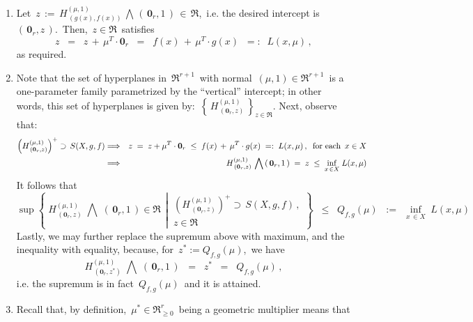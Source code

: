\begin{enumerate}
\item
	Let \,$z \,:=\, H^{(\mu,1)}_{\,(g(x),f(x))} \,\bigwedge\, (\,\mathbf{0}_{r},1\,) \,\in\, \Re$,\,
	i.e. the desired intercept is \,$(\,\mathbf{0}_{r},z\,)$.\, 
	Then, \,$z \in \Re$\, satisfies
	\begin{equation*}
	z
	\;\; = \;\;
		z \,+\, \mu^{T} \cdot \mathbf{0}_{r}
	\;\; = \;\;
		f(x) \,+\, \mu^{T} \cdot g(x)
	\;\; =: \;\;
		L(x,\mu)\,,
	\end{equation*}
	as required.
\item
	Note that the set of hyperplanes in \,$\Re^{r+1}$\,
	with normal \,$(\mu,1)\in\Re^{r+1}$\, is a one-parameter family
	parametrized by the ``vertical'' intercept;
	in other words, this set of hyperplanes is given by:
	\,$\left\{\,H^{(\mu,1)}_{\,(\mathbf{0}_{r},z)}\,\right\}_{z\in\Re}$.
	Next, observe that:
	\begin{eqnarray*}
	\left(H^{(\mu,1)}_{\,(\mathbf{0}_{r},z)}\right)^{+} \supset\, S(X,g,f)
	& \Longrightarrow &
		z \;=\; z + \mu^{T} \cdot \mathbf{0}_{r} \;\leq\; f(x) \,+\, \mu^{T} \cdot g(x) \;=:\; L(x,\mu)\,,
		\;\;\textnormal{for each \,$x \in X$}
	\\
	& \Longrightarrow &
		H^{(\mu,1)}_{\,(\mathbf{0}_{r},z)} \,\bigwedge\, (\,\mathbf{0}_{r},1\,)
		\; = \; z \; \leq \; \underset{x\,\in X}{\inf}\; L(x,\mu)
	\end{eqnarray*}
	It follows that
	\begin{equation*}
	\sup\left\{\;
		H^{(\mu,1)}_{\,(\mathbf{0}_{r},z)} \;\bigwedge\; (\,\mathbf{0}_{r},1\,) \in \Re
		\;\,\left\vert\,
		\begin{array}{c}
			\left(H^{(\mu,1)}_{\,(\mathbf{0}_{r},z)}\right)^{+} \supset\, S(X,g,f)\,,
			\\
			z \in \Re
			\end{array}
		\!\right.\right\}
	\;\; \leq \;\;
		Q_{f,g}(\mu)
	\;\; := \;\,
		\underset{x\,\in X}{\inf}\;L(x,\mu)
	\end{equation*}
	Lastly, we may further replace the supremum above with maximum, and the inequality with equality,
	because, for \,$z^{*} := Q_{f,g}(\mu)$,\, we have
	\begin{equation*}
	H^{(\mu,1)}_{\,(\mathbf{0}_{r},z^{*})} \;\bigwedge\; (\,\mathbf{0}_{r},1\,)
	\;\; = \;\;
		z^{*}
	\;\; = \;\;
		Q_{f,g}(\mu)\,,
	\end{equation*}
	i.e. the supremum is in fact \,$Q_{f,g}(\mu)$\, and it is attained.
\item
	Recall that, by definition, \,$\mu^{*} \in \Re_{\geq 0}^{r}$\, being a geometric multiplier means that

\end{enumerate}
